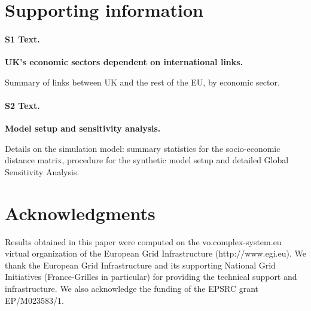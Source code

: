 \documentclass[10pt,letterpaper]{article}
\begin{document}
\section*{Supporting information}

\paragraph*{S1 Text.}
\label{S1Text}
{\bf UK's economic sectors dependent on international links.}

Summary of links between UK and the rest of the EU, by economic sector.

\paragraph*{S2 Text.}
\label{S2Text}
{\bf Model setup and sensitivity analysis.}

Details on the simulation model: summary statistics for the socio-economic distance matrix, procedure for the synthetic model setup and detailed Global Sensitivity Analysis.



\section*{Acknowledgments}

Results obtained in this paper were computed on the vo.complex-system.eu virtual organization of the European Grid Infrastructure (http://www.egi.eu). We thank the European Grid Infrastructure and its supporting National Grid Initiatives (France-Grilles in particular) for providing the technical support and infrastructure. We also acknowledge the funding of the EPSRC grant EP/M023583/1.




\end{document}
